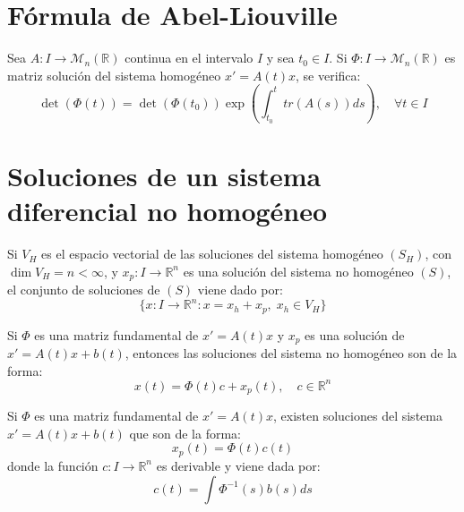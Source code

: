 \section{Fórmula de Abel-Liouville}
\begin{theorem}
    Sea $A: I \to \mathcal{M}_n(\mathbb{R})$ continua en el intervalo $I$ y sea $t_0 \in I$.
    Si $\Phi: I \to \mathcal{M}_n(\mathbb{R})$ es matriz solución del sistema homogéneo $x' = A(t)x$, se verifica:
    $$\det(\Phi(t)) = \det(\Phi(t_0)) \exp\left( \int_{t_0}^t tr(A(s))ds \right), \quad \forall t \in I$$
\end{theorem}

\section{Soluciones de un sistema diferencial no homogéneo}
\begin{proposition}
    Si $V_H$ es el espacio vectorial de las soluciones del sistema homogéneo $(S_H)$, con $\dim V_H = n < \infty$, y $x_p: I \to \mathbb{R}^n$ es una solución del sistema no homogéneo $(S)$, el conjunto de soluciones de $(S)$ viene dado por:
    $$\{x: I \to \mathbb{R}^n : x = x_h + x_p, \; x_h \in V_H\}$$
\end{proposition}

\begin{corollary}
    Si $\Phi$ es una matriz fundamental de $x' = A(t)x$ y $x_p$ es una solución de $x' = A(t)x + b(t)$, entonces las soluciones del sistema no homogéneo son de la forma:
    $$x(t) = \Phi(t)c + x_p(t), \quad c \in \mathbb{R}^n$$
\end{corollary}

\begin{proposition}
    Si $\Phi$ es una matriz fundamental de $x' = A(t)x$, existen soluciones del sistema $x' = A(t)x + b(t)$ que son de la forma:
    $$x_p(t) = \Phi(t)c(t)$$
    donde la función $c: I \to \mathbb{R}^n$ es derivable y viene dada por:
    $$c(t) = \int \Phi^{-1}(s)b(s)ds$$
\end{proposition}